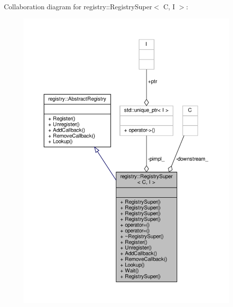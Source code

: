 Collaboration diagram for registry\+:\+:Registry\+Super$<$ C, I $>$\+:
\nopagebreak
\begin{figure}[H]
\begin{center}
\leavevmode
\includegraphics[width=350pt]{classregistry_1_1RegistrySuper__coll__graph}
\end{center}
\end{figure}
